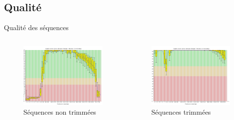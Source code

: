 \documentclass[xcolor=dvipsnames]{beamer}
\begin{document}
\subsection{Qualité}
\begin{frame}{Qualité des séquences}
  \begin{columns}[t]
    \centering
    \begin{figure}
      \includegraphics[width=\linewidth]{../per_base_quality_fastqc_untrimmed.png}
      \caption*{Séquences non trimmées}
    \end{figure}
    \centering
    \begin{figure}[htbp]
      \centering
      \includegraphics[width=\linewidth]{../per_base_quality_fastqc_trimmed.png}
      \caption*{Séquences trimmées}
    \end{figure}
  \end{columns}
\end{frame}
\end{document}
